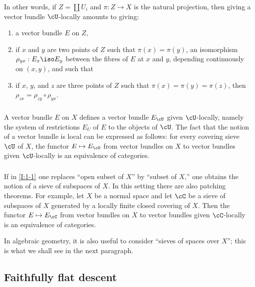 In other words, if $Z=\coprod U_i$ and $\pi:Z\to X$ is the natural
projection, then giving a vector bundle $\cU$-locally amounts to giving:
\begin{enumerate}[\indent a)]
  \item a vector bundle $E$ on $Z$,
  \item if $x$ and $y$ are two points of $Z$ such that
    $\pi(x)=\pi(y)$, an isomorphism $\rho_{yx}:E_x\iso E_y$ between the
    fibres of $E$ at $x$ and $y$, depending continuously on $(x,y)$,
    and such that
  \item if $x$, $y$, and $z$ are three points of $Z$ such that
    $\pi(x)=\pi(y)=\pi(z)$, then
    $\rho_{zx}=\rho_{zy}\circ\rho_{yx}$.
\end{enumerate}

\subsubsection{}\label{I:1-3-3}

A vector bundle $E$ on $X$ defines a vector bundle $E_\cU$ given
$\cU$-locally, namely the system of restrictions $E_U$ of $E$ to the
objects of $\cU$. The fact that the notion of a vector bundle is local can
be expressed as follows: for every covering sieve $\cU$ of $X$, the
functor $E\mapsto E_\cU$ from vector bundles on $X$ to vector bundles
given $\cU$-locally is an equivalence of categories.

\subsubsection{}\label{I:1-3-4}

If in \ref{I:1-1} one replaces “open subset of $X$” by “subset of $X$,”
one obtains the notion of a sieve of subspaces of $X$. In this setting
there are also patching theorems. For example, let $X$ be a normal space and
let $\cC$ be a sieve of subspaces of $X$ generated by a locally finite
closed covering of $X$. Then the functor $E\mapsto E_\cC$ from vector
bundles on $X$ to vector bundles given $\cC$-locally is an equivalence
of categories.

In algebraic geometry, it is also useful to consider “sieves of spaces
over $X$”; this is what we shall see in the next paragraph.

\subsection{Faithfully flat descent}\label{I:1-4}

